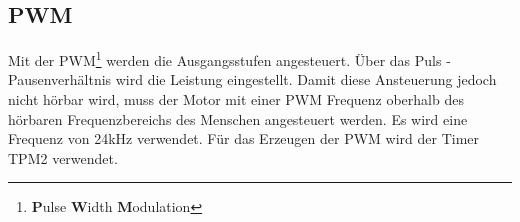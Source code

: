 \subsection{PWM}
Mit der PWM\footnote{\textbf{P}ulse \textbf{W}idth \textbf{M}odulation} werden 
die Ausgangsstufen angesteuert. Über das Puls - Pausenverhältnis wird die 
Leistung eingestellt. Damit diese Ansteuerung jedoch nicht hörbar wird, muss 
der Motor mit einer PWM Frequenz oberhalb des hörbaren Frequenzbereichs des 
Menschen angesteuert werden. Es wird eine Frequenz von 24\si{\kilo\hertz} 
verwendet.  Für das Erzeugen der PWM wird der Timer TPM2 verwendet. 

